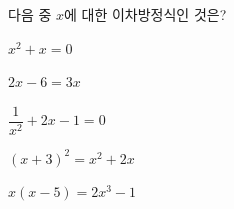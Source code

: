다음 중 $x$에 대한 이차방정식인 것은?
\begin{choicesii}{\rule[-3ex]{0pt}{8ex}$x^2+x=0$}{\rule[-3ex]{0pt}{8ex}$2x-6=3x$}{\rule[-3ex]{0pt}{8ex}$\dfrac{1}{x^2}+2x-1=0$}{\rule[-3ex]{0pt}{8ex}$(x+3)^2=x^2+2x$}{\rule[-3ex]{0pt}{8ex}$x(x-5)=2x^3-1$}\end{choicesii}
